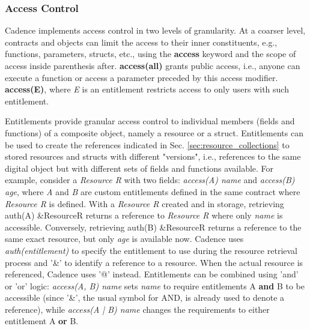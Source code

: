 \documentclass[../NFTComp_IEEE.tex]{subfiles}
\begin{document}
\subsubsection{Access Control}
Cadence implements access control in two levels of granularity. At a coarser level, contracts and objects can limit the access to their inner constituents, e.g., functions, parameters, structs, etc., using the \textbf{access} keyword and the scope of access inside parenthesis after. \textbf{access(all)} grants public access, i.e., anyone can execute a function or access a parameter preceded by this access modifier. \textbf{access(E)}, where \textit{E} is an entitlement restricts access to only users with such entitlement.
\par
Entitlements provide granular access control to individual members (fields and functions) of a composite object, namely a resource or a struct. Entitlements can be used to create the references indicated in Sec. \ref{sec:resource_collections} to stored resources and structs with different "versions", i.e., references to the same digital object but with different sets of fields and functions available. For example, consider a \textit{Resource R} with two fields: \textit{access(A) name} and \textit{access(B) age}, where \textit{A} and \textit{B} are custom entitlements defined in the same contract where \textit{Resource R} is defined. With a \textit{Resource R} created and in storage, retrieving auth(A) \&ResourceR returns a reference to \textit{Resource R} where only \textit{name} is accessible. Conversely, retrieving auth(B) \&ResourceR returns a reference to the same exact resource, but only \textit{age} is available now. Cadence uses \textit{auth(entitlement)} to specify the entitlement to use during the resource retrieval process and '\&' to identify a reference to a resource. When the actual resource is referenced, Cadence uses '@' instead. Entitlements can be combined using 'and' or 'or' logic: \textit{access(A, B) name} sets \textit{name} to require entitlements A \textbf{and} B to be accessible (since '\&', the usual symbol for AND, is already used to denote a reference), while \textit{access(A | B) name} changes the requirements to either entitlement A \textbf{or} B.
\end{document}
